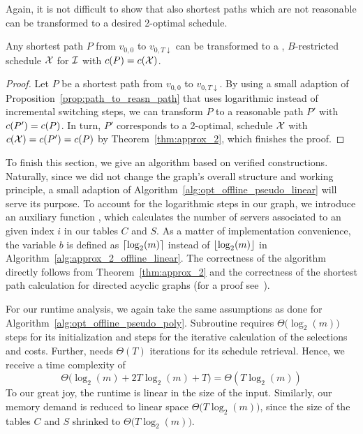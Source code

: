 Again, it is not difficult to show that also shortest paths which are not reasonable can be transformed to a desired 2-optimal schedule.
\begin{cor}
Any shortest path $P$ from $v_{0,0}$ to $v_{0,T\downarrow}$ can be transformed to a , $B$-restricted schedule $\mathcal{X}$ for $\mathcal{I}$ with $c(P)=c(\mathcal{X})$.
\end{cor}
\begin{proof}
Let $P$ be a shortest path from $v_{0,0}$ to $v_{0,T\downarrow}$. By using a small adaption of Proposition~\ref{prop:path_to_reasn_path} that uses logarithmic instead of incremental switching steps, we can transform $P$ to a reasonable path $P'$ with $c(P')=c(P)$.
In turn, $P'$ corresponds to a 2-optimal,  schedule $\mathcal{X}$ with $c(\mathcal{X})=c(P')=c(P)$ by Theorem~\ref{thm:approx_2}, which finishes the proof.
\end{proof}
To finish this section, we give an algorithm based on verified constructions. Naturally, since we did not change the graph's overall structure and working principle, a small adaption of Algorithm~\ref{alg:opt_offline_pseudo_linear} will serve its purpose. To account for the logarithmic steps in our graph, we introduce an auxiliary function , which calculates the number of servers associated to an given index $i$ in our tables $C$ and $S$. As a matter of implementation convenience, the variable $b$ is defined as $\lceil\log_2(m)\rceil$ instead of $\lfloor\log_2(m)\rfloor$ in Algorithm~\ref{alg:approx_2_offline_linear}.
The correctness of the algorithm directly follows from Theorem~\ref{thm:approx_2} and the correctness of the shortest path calculation for directed acyclic graphs (for a proof see~\parencite[Section~24.2]{intro-algo}).

For our runtime analysis, we again take the same assumptions as done for Algorithm~\ref{alg:opt_offline_pseudo_poly}. Subroutine  requires $\Theta\bigl(\log_2(m)\bigr)$ steps for its initialization and  steps for the iterative calculation of the selections and costs. Further,  needs $\Theta(T)$ iterations for its schedule retrieval. Hence, we receive a time complexity of
\begin{equation*}
	\Theta\bigl(\log_2(m)+2T\log_2(m)+T\bigr)=\Theta(T\log_2(m))
\end{equation*}
To our great joy, the runtime is linear in the size of the input. Similarly, our memory demand is reduced to linear space $\Theta\bigl(T\log_2(m)\bigr)$, since the size of the tables $C$ and $S$ shrinked to $\Theta\bigl(T\log_2(m)\bigr)$.


